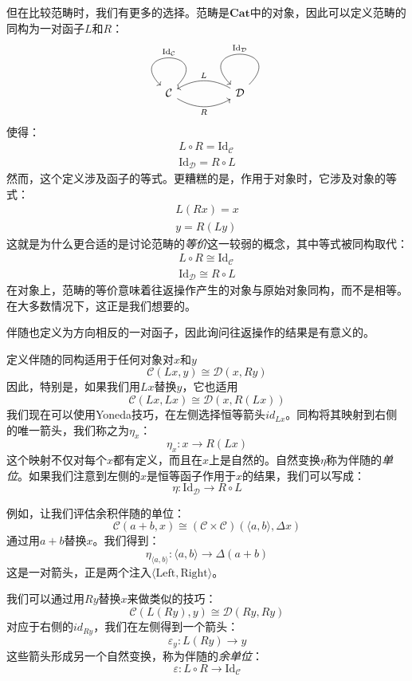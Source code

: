 \documentclass[DaoFP]{subfiles}
\begin{document}
但在比较范畴时，我们有更多的选择。范畴是$\mathbf{Cat}$中的对象，因此可以定义范畴的同构为一对函子$L$和$R$：
\[
 \begin{tikzcd}
  \mathcal{C}
  \arrow[rr, bend right, "R"']
  \arrow[loop, "\text{Id}_{ \mathcal{C}} "']
  &&
  \mathcal{D}
  \arrow[ll, bend right, "L"']
  \arrow[loop, "\text{Id}_{ \mathcal{D}} "']
  \end{tikzcd}
\]
使得：
\begin{align*}
L \circ R = \text{Id}_{ \mathcal{C}} \\
\text{Id}_{ \mathcal{D}} = R \circ L 
\end{align*}
然而，这个定义涉及函子的等式。更糟糕的是，作用于对象时，它涉及对象的等式：
\begin{align*}
 L (R x) = x \\
 y = R (L y)
\end{align*}
这就是为什么更合适的是讨论范畴的\emph{等价}这一较弱的概念，其中等式被同构取代：
\begin{align*}
L \circ R \cong \text{Id}_{ \mathcal{C}} \\
 \text{Id}_{ \mathcal{D}} \cong R \circ L 
\end{align*}
在对象上，范畴的等价意味着往返操作产生的对象与原始对象同构，而不是相等。在大多数情况下，这正是我们想要的。

伴随也定义为方向相反的一对函子，因此询问往返操作的结果是有意义的。

定义伴随的同构适用于任何对象对$x$和$y$
\[  \mathcal{C} (L x, y) \cong \mathcal{D}( x , R y)\]
因此，特别是，如果我们用$L x$替换$y$，它也适用
\[  \mathcal{C} (L x, L x) \cong \mathcal{D}( x , R (L x))\]
我们现在可以使用Yoneda技巧，在左侧选择恒等箭头$id_{L x}$。同构将其映射到右侧的唯一箭头，我们称之为$\eta_x$：
\[ \eta_x \colon x \to R ( L x) \]
这个映射不仅对每个$x$都有定义，而且在$x$上是自然的。自然变换$\eta$称为伴随的\emph{单位}。如果我们注意到左侧的$x$是恒等函子作用于$x$的结果，我们可以写成：
\[ \eta \colon \text{Id}_{\mathcal{D}} \to R \circ L \]

例如，让我们评估余积伴随的单位：
\[  \mathcal{C} (a + b, x) \cong (\mathcal{C} \times \mathcal{C})( \langle a, b \rangle , \Delta x)\]
通过用$a + b$替换$x$。我们得到：
\[ \eta_{\langle a, b \rangle} \colon \langle a, b \rangle \to \Delta(a + b) \]
这是一对箭头，正是两个注入$\langle \text{Left}, \text{Right} \rangle$。

我们可以通过用$R y$替换$x$来做类似的技巧：
\[  \mathcal{C} (L (R y), y) \cong \mathcal{D}( R y , R y)\]
对应于右侧的$id_{R y}$，我们在左侧得到一个箭头：
\[ \varepsilon_y \colon L (R y) \to y \]
这些箭头形成另一个自然变换，称为伴随的\emph{余单位}：
\[ \varepsilon \colon L \circ R \to \text{Id}_{\mathcal{C}}  \]
\end{document}
